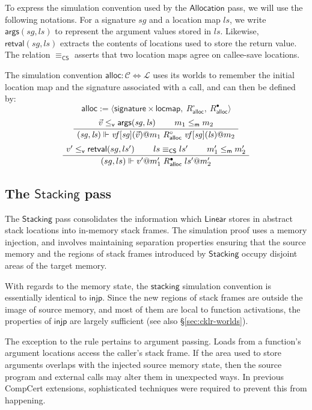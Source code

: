 \documentclass[sigplan,screen]{acmart}
\newcommand{\kw}[1]{\ensuremath{ \mathsf{#1} }}
\newcommand{\que}{\circ}
\newcommand{\ans}{\bullet}
\newcommand{\vref}{\le_\kw{v}}
\newcommand{\mext}{\le_\kw{m}}
\newenvironment{optional}{}{}
\begin{document}
\begin{optional}
To express the simulation convention used by the \kw{Allocation} pass,
we will use the following notations.
For a signature $\mathit{sg}$ and a location map $\mathit{ls}$,
we write $\kw{args}(\mathit{sg}, \mathit{ls})$
to represent the argument values stored in $\mathit{ls}$.
Likewise,
$\kw{retval}(\mathit{sg}, \mathit{ls})$ extracts
the contents of locations used to store the return value.
The relation $\equiv_\kw{CS}$ asserts that
two location maps agree on callee-save locations.

The simulation convention
$\kw{alloc} : \mathcal{C} \Leftrightarrow \mathcal{L}$
uses its worlds to remember the initial location map
and the signature associated with a call,
and can then be defined by:
\[
  \kw{alloc} := \langle
      \kw{signature} \times \kw{locmap}, \:
      R_\kw{alloc}^\que, \:
      R_\kw{alloc}^\ans \rangle
\]
\[
  \AxiomC{$\vec{v} \vref \kw{args}(\mathit{sg}, \mathit{ls})$}
  \AxiomC{$m_1 \mext m_2$}
  \BinaryInfC{$
      (\mathit{sg}, \mathit{ls}) \Vdash
      \mathit{vf}[\mathit{sg}](\vec{v})@m_1
      \mathrel{R_\kw{alloc}^\que}
      \mathit{vf}[\mathit{sg}](\mathit{ls})@m_2$}
  \DisplayProof
\]
\[
  \AxiomC{$v' \vref \kw{retval}(sg, ls')$}
  \AxiomC{$ls \equiv_\kw{CS} ls'$}
  \AxiomC{$m_1' \mext m_2'$}
  \TrinaryInfC{$
      (sg, ls) \Vdash
      v'@m_1'
      \mathrel{R_\kw{alloc}^\ans}
      ls'@m_2'$}
  \DisplayProof
\]


\subsection{The \kw{Stacking} pass} \label{sec:stacking} %

The \kw{Stacking} pass
consolidates the information which
\kw{Linear} stores in abstract stack locations
into in-memory stack frames.
The simulation proof uses a memory injection,
and involves maintaining separation properties
ensuring that the source memory and
the regions of stack frames
introduced by \kw{Stacking}
occupy disjoint areas of the target memory.

With regards to the memory state,
the \kw{stacking} simulation convention
is essentially identical to \kw{injp}.
Since the new regions of stack frames
are outside the image of source memory,
and most of them are local to
function activations,
the properties of \kw{injp}
are largely sufficient
(see also \S\ref{sec:cklr-worlds}).

The exception to the rule pertains to argument passing.
Loads from a function's argument locations
access the caller's stack frame.
If the area used to store arguments
overlaps with the injected source memory state,
then the source program and external calls
may alter them in unexpected ways.
In previous CompCert extensions,
sophisticated techniques were required
to prevent this from happening.


\end{optional}
\end{document}

